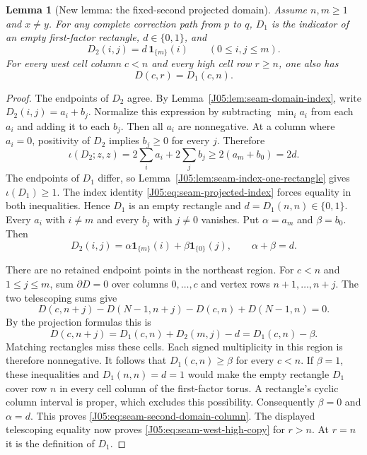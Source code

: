 \documentclass[11pt,oneside]{report}
\newtheorem{lemma}[theorem]{Lemma}
\theoremstyle{definition}
\numberwithin{equation}{section}
\begin{document}
\begin{lemma}[New lemma: the fixed-second projected domain]
\label{J05:lem:seam-first-domain-shape}
Assume $n,m\geq1$ and $x\ne y$. For any complete correction path
from $p$ to $q$, $D_1$ is the indicator of an empty first-factor
rectangle, $d\in\{0,1\}$, and
\begin{equation}\label{J05:eq:seam-second-domain-column}
 D_2(i,j)=d\,\mathbf1_{\{m\}}(i)
 \qquad(0\leq i,j\leq m).
\end{equation}
For every west cell column $c<n$ and every high cell row $r\geq n$,
one also has
\begin{equation}\label{J05:eq:seam-west-high-copy}
 D(c,r)=D_1(c,n).
\end{equation}
\end{lemma}
\begin{proof}
The endpoints of $D_2$ agree. By
Lemma~\ref{J05:lem:seam-domain-index}, write $D_2(i,j)=a_i+b_j$.
Normalize this expression by subtracting $\min_i a_i$ from each
$a_i$ and adding it to each $b_j$. Then all $a_i$ are nonnegative.
At a column where $a_i=0$, positivity of $D_2$ implies $b_j\geq0$
for every $j$. Therefore
\[
 \iota(D_2;z,z)=2\sum_i a_i+2\sum_j b_j
 \geq 2(a_m+b_0)=2d.
\]
The endpoints of $D_1$ differ, so
Lemma~\ref{J05:lem:seam-index-one-rectangle} gives $\iota(D_1)\geq1$.
The index identity \eqref{J05:eq:seam-projected-index} forces equality in
both inequalities. Hence $D_1$ is an empty rectangle and
$d=D_1(n,n)\in\{0,1\}$. Every $a_i$ with $i\ne m$ and every
$b_j$ with $j\ne0$ vanishes. Put $\alpha=a_m$ and $\beta=b_0$.
Then
\[
 D_2(i,j)=\alpha\mathbf1_{\{m\}}(i)
              +\beta\mathbf1_{\{0\}}(j),\qquad
 \alpha+\beta=d.
\]

There are no retained endpoint points in the northeast region.
For $c<n$ and $1\leq j\leq m$, sum
$\partial D=0$ over columns $0,\ldots,c$ and vertex rows
$n+1,\ldots,n+j$. The two telescoping sums give
\[
 D(c,n+j)-D(N-1,n+j)-D(c,n)+D(N-1,n)=0.
\]
By the projection formulas this is
\[
 D(c,n+j)=D_1(c,n)+D_2(m,j)-d=D_1(c,n)-\beta.
\]
Matching rectangles miss these cells. Each signed multiplicity in this
region is therefore nonnegative. It follows that
$D_1(c,n)\geq\beta$ for every $c<n$.
If $\beta=1$, these inequalities and $D_1(n,n)=d=1$ would make the
empty rectangle $D_1$ cover row $n$ in every cell column of the
first-factor torus. A rectangle's cyclic column interval is proper,
which excludes this possibility. Consequently $\beta=0$ and
$\alpha=d$. This proves \eqref{J05:eq:seam-second-domain-column}.
The displayed telescoping equality now proves
\eqref{J05:eq:seam-west-high-copy} for $r>n$. At $r=n$ it is the
definition of $D_1$.
\end{proof}
\end{document}
